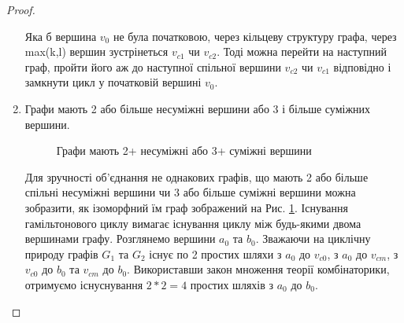 \documentclass[a4paper,14pt,ukrainian]{extarticle}
\begin{document}
\begin{proof}
\begin{enumerate}
\begin{figure}[h]
                \end{figure}
                Яка б вершина $v_0$ не була початковою, через кільцеву структуру графа, через max(k,l) вершин зустрінеться $v_{c1}$ чи $v_{c2}$.
                Тоді можна перейти на наступний граф, пройти його аж до наступної спільної вершини $v_{c2}$ чи $v_{c1}$ відповідно і замкнути цикл у початковій вершині $v_0$.
            \item Графи мають 2 або більше несуміжні вершини або 3 і більше суміжних вершини.
                \begin{figure}[h]
                    \label{jg2+na3+a}
                    \caption{Графи мають 2+ несуміжні або 3+ суміжні вершини}
                    \centering
                \end{figure}
                Для зручності об’єднання не однакових графів, що мають 2 або більше спільні несуміжні вершини чи 3 або більше суміжні вершини можна зобразити, як ізоморфний їм граф зображений на Рис. \ref{jg2+na3+a}.
                Існування гамільтонового циклу вимагає існування циклу між будь-якими двома вершинами графу.
                Розглянемо вершини $a_0$ та $b_0$.
                Зважаючи на циклічну природу графів $G_1$ та $G_2$ існує по 2 простих шляхи з $a_0$ до $v_{c0}$, з $a_0$ до $v_{cm}$, з $v_{c0}$ до $b_0$ та $v_{cm}$ до $b_0$.
                Використавши закон множення теорії комбінаторики, отримуємо існуснування $2*2=4$ простих шляхів з $a_0$ до $b_0$.

\end{enumerate}
\end{proof}
\end{document}
